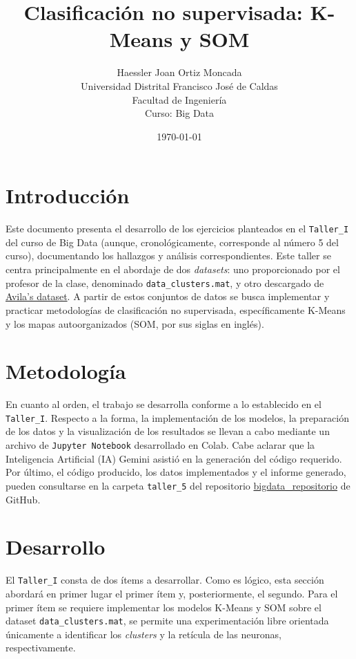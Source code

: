 \documentclass[12pt,a4paper]{article}
\title{\textbf{Clasificación no supervisada: K-Means y SOM}}
\author{Haessler Joan Ortiz Moncada \\[0.5cm]
        Universidad Distrital Francisco José de Caldas \\
        Facultad de Ingeniería \\
        Curso: Big Data}
\date{\today}
\begin{document}
\maketitle

\section{Introducción}
Este documento presenta el desarrollo de los ejercicios planteados en el \texttt{Taller\_I} 
del curso de Big Data (aunque, cronológicamente, corresponde al número 5 del curso), documentando los hallazgos 
y análisis correspondientes. Este taller se centra principalmente en el abordaje de dos \textit{\textit{datasets}}: 
uno proporcionado por el profesor de la clase, denominado \texttt{data\_clusters.mat}, y otro descargado 
de \href{https://archive.ics.uci.edu/dataset/459/avila}{Avila's dataset}. A partir de estos conjuntos de 
datos se busca implementar y practicar metodologías de clasificación no supervisada, específicamente 
K-Means y los mapas autoorganizados (SOM, por sus siglas en inglés).

\section{Metodología}
En cuanto al orden, el trabajo se desarrolla conforme a lo establecido en el \texttt{Taller\_I}. 
Respecto a la forma, la implementación de los modelos, la preparación de los datos y la visualización de 
los resultados se llevan a cabo mediante un archivo de \texttt{Jupyter Notebook} desarrollado en Colab. 
Cabe aclarar que la Inteligencia Artificial (IA) Gemini asistió en la generación del código requerido. 
Por último, el código producido, los datos implementados y el informe generado, pueden consultarse en la 
carpeta \texttt{taller\_5} del repositorio \href{https://github.com/HaesslerOrtiz/bigdata}{bigdata\_repositorio} 
de GitHub.

\section{Desarrollo}
El \texttt{Taller\_I} consta de dos ítems a desarrollar. Como es lógico, esta sección abordará en primer lugar 
el primer ítem y, posteriormente, el segundo. Para el primer ítem se requiere implementar los modelos K-Means 
y SOM sobre el dataset \texttt{data\_clusters.mat}, se permite una experimentación libre orientada únicamente 
a identificar los \textit{clusters} y la retícula de las neuronas, respectivamente.
\end{document}
